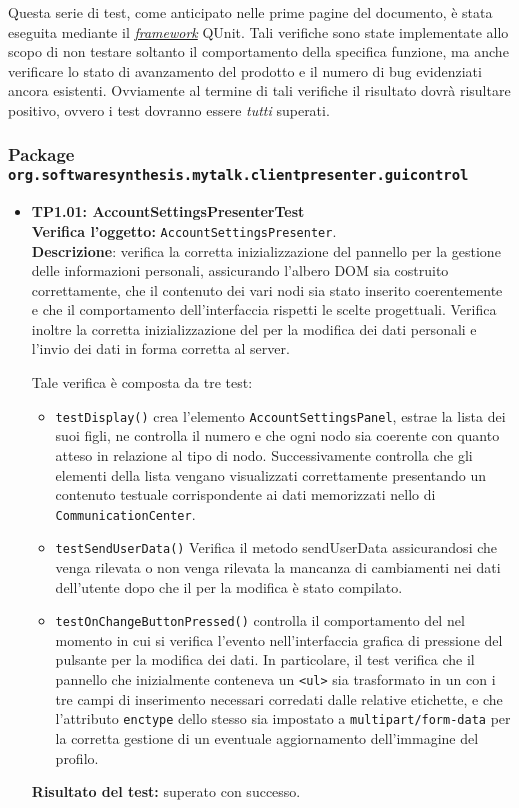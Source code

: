 Questa serie di test, come anticipato nelle prime pagine del documento, è stata eseguita mediante il \underline{\textit{framework}} QUnit. Tali verifiche sono state implementate allo scopo di non testare soltanto il comportamento della specifica funzione, ma anche verificare lo stato di avanzamento del prodotto e il numero di bug evidenziati ancora esistenti.
Ovviamente al termine di tali verifiche il risultato dovrà risultare positivo, ovvero i test dovranno essere \textit{tutti} superati.

\subsubsection{Package \texttt{org.softwaresynthesis.mytalk.clientpresenter.guicontrol}}

\begin{itemize}
\item \textbf{TP1.01: AccountSettingsPresenterTest}\\
\textbf{Verifica l'oggetto:} \texttt{AccountSettingsPresenter}.\\
\textbf{Descrizione}: verifica la corretta inizializzazione del pannello per la gestione delle informazioni personali, assicurando l'albero DOM sia costruito correttamente, che il contenuto dei vari nodi sia stato inserito coerentemente e che il comportamento dell'interfaccia rispetti le scelte progettuali. Verifica inoltre la corretta inizializzazione del  per la modifica dei dati personali e l'invio dei dati in forma corretta al server.

Tale verifica è composta da tre test:
\begin{itemize}

\item \texttt{testDisplay()} crea l'elemento \texttt{AccountSettingsPanel}, estrae la lista dei suoi figli, ne controlla il numero e che ogni nodo sia coerente con quanto atteso in relazione al tipo di nodo.
Successivamente controlla che gli elementi della lista vengano visualizzati correttamente presentando un contenuto testuale corrispondente ai dati memorizzati nello  di \texttt{CommunicationCenter}.

\item \texttt{testSendUserData()} Verifica il metodo sendUserData assicurandosi che venga rilevata o non venga rilevata la mancanza di cambiamenti nei dati dell'utente dopo che il  per la modifica è stato compilato.

\item \texttt{testOnChangeButtonPressed()} controlla il comportamento del  nel momento in cui si verifica l'evento nell'interfaccia grafica di pressione del pulsante per la modifica dei dati. In particolare, il test verifica che il pannello che inizialmente conteneva un \verb'<ul>' sia trasformato in un  con i tre campi di inserimento necessari corredati dalle relative etichette, e che l'attributo \verb'enctype' dello stesso sia impostato a \verb'multipart/form-data' per la corretta gestione di un eventuale aggiornamento dell'immagine del profilo.
\end{itemize}
\textbf{Risultato del test:} superato con successo.


\end{itemize}
